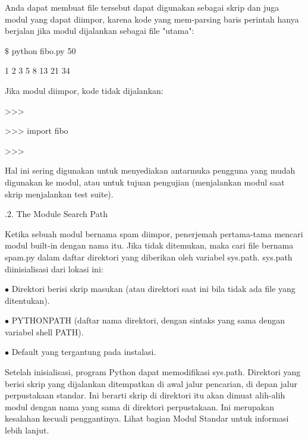 \vspace{12pt}
\noindent 
Anda dapat membuat file tersebut dapat digunakan sebagai skrip dan juga modul yang dapat diimpor, karena kode yang mem-parsing baris perintah hanya berjalan jika modul dijalankan sebagai file "utama": \par
\vspace{12pt}
\noindent 
 $  \$  $ python fibo.py 50 \par
{} 1 2 3 5 8 13 21 34 \par
\noindent 
Jika modul diimpor, kode tidak dijalankan: \par
\noindent 
>>> \par
\noindent 
>>> import fibo \par
\noindent 
>>> \par
\noindent 
Hal ini sering digunakan untuk menyediakan antarmuka pengguna yang mudah digunakan ke modul, atau untuk tujuan pengujian (menjalankan modul saat skrip menjalankan test suite). \par
\vspace{12pt}
.2. The Module Search Path \par
\noindent 
Ketika sebuah modul bernama spam diimpor, penerjemah pertama-tama mencari modul built-in dengan nama itu. Jika tidak ditemukan, maka cari file bernama spam.py dalam daftar direktori yang diberikan oleh variabel sys.path. sys.path diinisialisasi dari lokasi ini: \par
\vspace{12pt}
\vspace{12pt}
\vspace{12pt}
\noindent 
 $ \bullet $ Direktori berisi skrip masukan (atau direktori saat ini bila tidak ada file yang ditentukan). \par
\noindent 
 $ \bullet $ PYTHONPATH (daftar nama direktori, dengan sintaks yang sama dengan variabel shell PATH). \par
\noindent 
 $ \bullet $ Default yang tergantung pada instalasi. \par
\vspace{12pt}
\noindent 
Setelah inisialisasi, program Python dapat memodifikasi sys.path. Direktori yang berisi skrip yang dijalankan ditempatkan di awal jalur pencarian, di depan jalur perpustakaan standar. Ini berarti skrip di direktori itu akan dimuat alih-alih modul dengan nama yang sama di direktori perpustakaan. Ini merupakan kesalahan kecuali penggantinya. Lihat bagian Modul Standar untuk informasi lebih lanjut. \par
